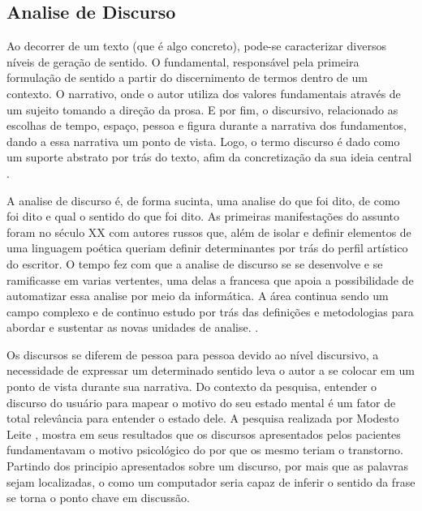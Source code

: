\subsection{Analise de Discurso}
Ao decorrer de um texto (que é algo concreto), pode-se caracterizar diversos níveis de geração de sentido. O fundamental, responsável pela primeira formulação de sentido a partir do discernimento de termos dentro de um contexto. O narrativo, onde o autor utiliza dos valores fundamentais através de um sujeito tomando a direção da prosa. E por fim, o discursivo, relacionado as escolhas de tempo, espaço, pessoa e figura durante a narrativa dos fundamentos, dando a essa narrativa um ponto de vista. Logo, o termo discurso é dado como um suporte abstrato por trás do texto, afim da concretização da sua ideia central \cite[13-17]{gregolin1995ad}.

A analise de discurso é, de forma sucinta, uma analise do que foi dito, de como foi dito e qual o sentido do que foi dito. As primeiras manifestações do assunto foram no século XX com autores russos que, além de isolar e definir elementos de uma linguagem poética queriam definir determinantes por trás do perfil artístico do escritor. O tempo fez com que a analise de discurso se se desenvolve e se ramificasse em varias vertentes, uma delas a francesa que apoia a possibilidade de automatizar essa analise por meio da informática. A área continua sendo um campo complexo e de continuo estudo por trás das definições e metodologias para abordar e sustentar as novas unidades de analise. \cite[22]{souza2006ad}.

Os discursos se diferem de pessoa para pessoa devido ao nível discursivo, a necessidade de expressar um determinado sentido leva o autor a se colocar em um ponto de vista durante sua narrativa. Do contexto da pesquisa, entender o discurso do usuário para mapear o motivo do seu estado mental é um fator de total relevância para entender o estado dele. A pesquisa realizada por Modesto Leite \cite[134]{modesto2005adepre}, mostra em seus resultados que os discursos apresentados pelos pacientes fundamentavam o motivo psicológico do por que os mesmo teriam o transtorno. Partindo dos principio apresentados sobre um discurso, por mais que as palavras sejam localizadas, o como um computador seria capaz de inferir o sentido da frase se torna o ponto chave em discussão.
